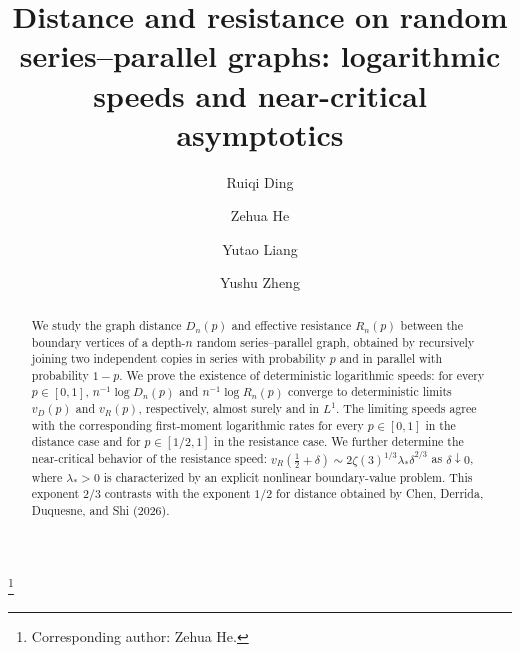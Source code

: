 \documentclass[12pt,preprint]{amsart}
\numberwithin{equation}{section}
\theoremstyle{plain}
\theoremstyle{definition}
\begin{document}
%
%
\title[Distance and resistance on random series--parallel graphs]{Distance and resistance on random series--parallel graphs:
logarithmic speeds and near-critical asymptotics}

\author[Ding et~al.]{Ruiqi Ding}
\author[]{Zehua He}
\author[]{Yutao Liang}
\author[]{Yushu Zheng}
\thanks{Corresponding author: Zehua He.}

\address{
State Key Laboratory of Mathematical Sciences, Academy of Mathematics and
Systems Science, Chinese Academy of Sciences, Beijing 100190, China}
\address{
School of Mathematical Sciences, University of Chinese Academy of Sciences,
Beijing 100049, China}
\address{
School of Mathematics, Shanghai University of Finance and Economics,
Shanghai 200433, China}


%
%
%
%
%
%
%
%
%
%
%

\begin{abstract}
We study the graph distance $D_n(p)$ and effective resistance
$R_n(p)$ between the boundary vertices of a depth-$n$ random series--parallel
graph, obtained by recursively joining two independent copies in series with
probability $p$ and in parallel with probability $1-p$. We prove the
existence of deterministic logarithmic speeds: for every $p\in[0,1]$,
$n^{-1}\log D_n(p)$ and $n^{-1}\log R_n(p)$ converge to deterministic limits
$v_D(p)$ and $v_R(p)$, respectively, almost surely and in $L^1$. The
limiting speeds agree with the corresponding first-moment logarithmic rates
for every $p\in[0,1]$ in the distance case and for $p\in[1/2,1]$ in the
resistance case.
We further determine the near-critical behavior of the resistance speed:
$v_R(\frac12+\delta)\sim
2\zeta(3)^{1/3}\lambda_*\delta^{2/3}$ as $\delta\downarrow0$, where
$\lambda_*>0$ is characterized by an explicit nonlinear boundary-value
problem. This exponent $2/3$ contrasts with the exponent $1/2$ for distance
obtained by Chen, Derrida, Duquesne, and Shi (2026).
%
\end{abstract}

%
%
%
\maketitle
{}
\end{document}
